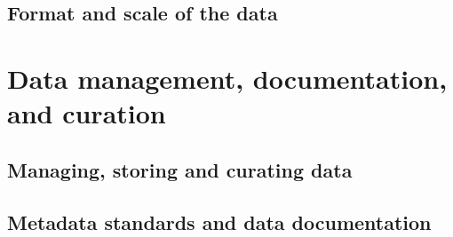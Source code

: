 \documentclass[a4paper,11pt]{article}
\begin{document}
\subsection{Format and scale of the data}

\section{Data management, documentation, and curation}
\subsection{Managing, storing and curating data}
\subsection{Metadata standards and data documentation}
\end{document}
